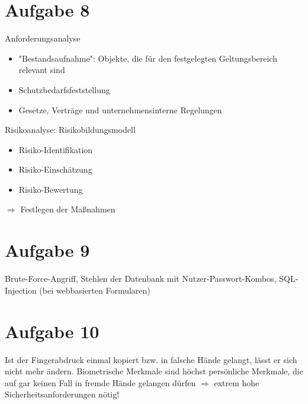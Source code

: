 \documentclass{article}
\begin{document}
	\section*{Aufgabe 8}
	Anforderungsanalyse
	\begin{itemize}
		\item "Bestandsaufnahme": Objekte, die für den festgelegten Geltungsbereich relevant sind
		\item Schutzbedarfsfeststellung
		\item Gesetze, Verträge und unternehmensinterne Regelungen
	\end{itemize}
	Risikoanalyse: Risikobildungsmodell
	\begin{itemize}
		\item Risiko-Identifikation
		\item Risiko-Einschätzung
		\item Risiko-Bewertung
	\end{itemize}
	$\Rightarrow$ Festlegen der Maßnahmen

	\section*{Aufgabe 9}
	Brute-Force-Angriff, Stehlen der Datenbank mit Nutzer-Passwort-Kombos, SQL-Injection (bei webbasierten Formularen)
	
	\section*{Aufgabe 10}
	Ist der Fingerabdruck einmal kopiert bzw. in falsche Hände gelangt, lässt er sich nicht mehr ändern. Biometrische Merkmale sind höchst persönliche Merkmale, die auf gar keinen Fall in fremde Hände gelangen dürfen $\Rightarrow$ extrem hohe Sicherheitsanforderungen nötig!
\end{document}
